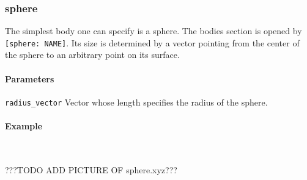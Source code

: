 \subsubsection{sphere}
The simplest body one can specify is a sphere. The bodies section is opened by \lstinline{[sphere: NAME]}. Its size is determined by a  vector pointing from the center of the sphere to an arbitrary point on its surface.

\paragraph{Parameters}
\begin{description}
 \item{\lstinline{radius_vector}} Vector whose length specifies the radius of the sphere.
\end{description}

\paragraph{Example}\ 

%
???TODO ADD PICTURE OF sphere.xyz???